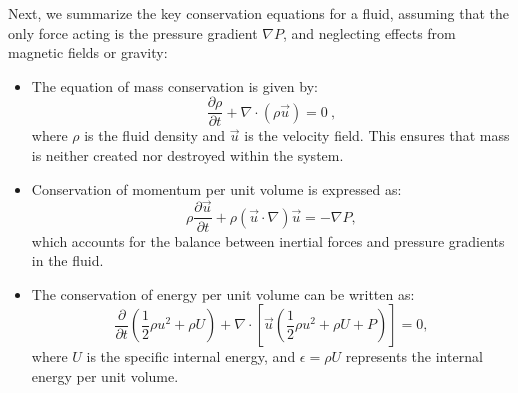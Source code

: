 Next, we summarize the key conservation equations for a fluid, assuming that the only force acting is the pressure gradient \( \nabla P \), and neglecting effects from magnetic fields or gravity:
%
\begin{itemize}  
\item The equation of mass conservation is given by:
   \begin{equation}
   \frac{\partial \rho}{\partial t} + \nabla \cdot (\rho \vec{u}) = 0~,
   \end{equation}
   where \( \rho \) is the fluid density and \( \vec{u} \) is the velocity field. This ensures that mass is neither created nor destroyed within the system.

\item Conservation of momentum per unit volume is expressed as:
   \begin{equation}
   \rho \frac{\partial \vec{u}}{\partial t} + \rho (\vec{u} \cdot \nabla) \vec{u} = -\nabla P,
   \end{equation}
   which accounts for the balance between inertial forces and pressure gradients in the fluid.

\item The conservation of energy per unit volume can be written as:
   \begin{equation}
   \frac{\partial}{\partial t} \left( \frac{1}{2} \rho u^2 + \rho U \right) + \nabla \cdot \left[ \vec{u} \left( \frac{1}{2} \rho u^2 + \rho U + P \right) \right] = 0,
   \end{equation}
   where \( U \) is the specific internal energy, and \( \epsilon = \rho U \) represents the internal energy per unit volume.
\end{itemize}



